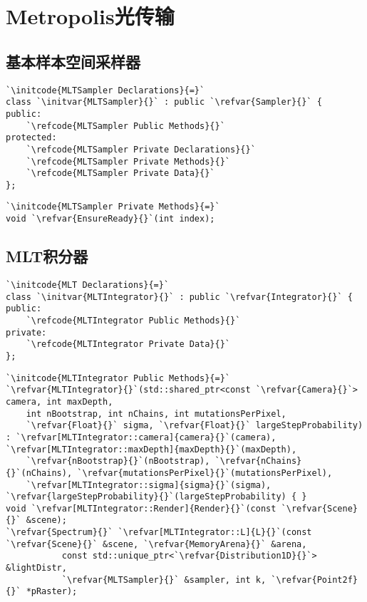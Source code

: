 \section{Metropolis光传输}\label{sec:Metropolis光传输}

\subsection{基本样本空间采样器}\label{sub:基本样本空间采样器}
\begin{lstlisting}
`\initcode{MLTSampler Declarations}{=}`
class `\initvar{MLTSampler}{}` : public `\refvar{Sampler}{}` {
public:
    `\refcode{MLTSampler Public Methods}{}`
protected:
    `\refcode{MLTSampler Private Declarations}{}`
    `\refcode{MLTSampler Private Methods}{}`
    `\refcode{MLTSampler Private Data}{}`
};
\end{lstlisting}
\begin{lstlisting}
`\initcode{MLTSampler Private Methods}{=}`
void `\refvar{EnsureReady}{}`(int index);
\end{lstlisting}

\subsection{MLT积分器}\label{sub:MLT积分器}
\begin{lstlisting}
`\initcode{MLT Declarations}{=}`
class `\initvar{MLTIntegrator}{}` : public `\refvar{Integrator}{}` {
public:
    `\refcode{MLTIntegrator Public Methods}{}`
private:
    `\refcode{MLTIntegrator Private Data}{}`
};
\end{lstlisting}
\begin{lstlisting}
`\initcode{MLTIntegrator Public Methods}{=}`
`\refvar{MLTIntegrator}{}`(std::shared_ptr<const `\refvar{Camera}{}`> camera, int maxDepth,
    int nBootstrap, int nChains, int mutationsPerPixel, 
    `\refvar{Float}{}` sigma, `\refvar{Float}{}` largeStepProbability) : `\refvar[MLTIntegrator::camera]{camera}{}`(camera), `\refvar[MLTIntegrator::maxDepth]{maxDepth}{}`(maxDepth),
    `\refvar{nBootstrap}{}`(nBootstrap), `\refvar{nChains}{}`(nChains), `\refvar{mutationsPerPixel}{}`(mutationsPerPixel), 
    `\refvar[MLTIntegrator::sigma]{sigma}{}`(sigma), `\refvar{largeStepProbability}{}`(largeStepProbability) { }
void `\refvar[MLTIntegrator::Render]{Render}{}`(const `\refvar{Scene}{}` &scene);
`\refvar{Spectrum}{}` `\refvar[MLTIntegrator::L]{L}{}`(const `\refvar{Scene}{}` &scene, `\refvar{MemoryArena}{}` &arena,
           const std::unique_ptr<`\refvar{Distribution1D}{}`> &lightDistr,
           `\refvar{MLTSampler}{}` &sampler, int k, `\refvar{Point2f}{}` *pRaster);
\end{lstlisting}

